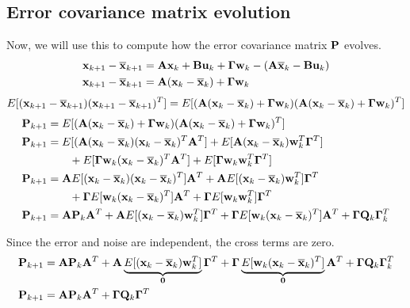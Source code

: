 \subsection{Error covariance matrix evolution}

Now, we will use this to compute how the \gls{error} covariance matrix $\mathbf{P}$
evolves.
\begin{align*}
  \mathbf{x}_{k+1} - \overline{\mathbf{x}}_{k+1} &= \mathbf{A}\mathbf{x}_k +
    \mathbf{B}\mathbf{u}_k + \mathbf{\Gamma}\mathbf{w}_k - (\mathbf{A}\overline{\mathbf{x}}_k -
    \mathbf{B}\mathbf{u}_k) \\
  \mathbf{x}_{k+1} - \overline{\mathbf{x}}_{k+1} &=
    \mathbf{A}(\mathbf{x}_k - \overline{\mathbf{x}}_k) + \mathbf{\Gamma}\mathbf{w}_k
\end{align*}
\begin{equation*}
  E[(\mathbf{x}_{k+1} - \overline{\mathbf{x}}_{k+1})(\mathbf{x}_{k+1} - \overline{\mathbf{x}}_{k+1})^T] =
    E[(\mathbf{A}(\mathbf{x}_k - \overline{\mathbf{x}}_k) + \mathbf{\Gamma}\mathbf{w}_k)
      (\mathbf{A}(\mathbf{x}_k - \overline{\mathbf{x}}_k) + \mathbf{\Gamma}\mathbf{w}_k)^T]
\end{equation*}
\begin{align*}
  \mathbf{P}_{k+1} &=
    E[(\mathbf{A}(\mathbf{x}_k - \overline{\mathbf{x}}_k) + \mathbf{\Gamma}\mathbf{w}_k)
      (\mathbf{A}(\mathbf{x}_k - \overline{\mathbf{x}}_k) + \mathbf{\Gamma}\mathbf{w}_k)^T] \\
  \mathbf{P}_{k+1} &=
    E[(\mathbf{A}(\mathbf{x}_k - \overline{\mathbf{x}}_k)(\mathbf{x}_k - \overline{\mathbf{x}}_k)^T
      \mathbf{A}^T] +
    E[\mathbf{A}(\mathbf{x}_k - \overline{\mathbf{x}}_k)\mathbf{w}_k^T\mathbf{\Gamma}^T] \\
    &\qquad + E[\mathbf{\Gamma}\mathbf{w}_k(\mathbf{x}_k - \overline{\mathbf{x}}_k)^T\mathbf{A}^T] +
    E[\mathbf{\Gamma}\mathbf{w}_k\mathbf{w}_k^T\mathbf{\Gamma}^T] \\
  \mathbf{P}_{k+1} &=
    \mathbf{A}E[(\mathbf{x}_k - \overline{\mathbf{x}}_k)(\mathbf{x}_k - \overline{\mathbf{x}}_k)^T]
    \mathbf{A}^T +
    \mathbf{A}E[(\mathbf{x}_k - \overline{\mathbf{x}}_k)\mathbf{w}_k^T]\mathbf{\Gamma}^T \\
    &\qquad + \mathbf{\Gamma} E[\mathbf{w}_k(\mathbf{x}_k - \overline{\mathbf{x}}_k)^T]\mathbf{A}^T +
    \mathbf{\Gamma} E[\mathbf{w}_k\mathbf{w}_k^T]\mathbf{\Gamma}^T \\
  \mathbf{P}_{k+1} &= \mathbf{A}\mathbf{P}_k\mathbf{A}^T +
    \mathbf{A}E[(\mathbf{x}_k - \overline{\mathbf{x}}_k)\mathbf{w}_k^T]\mathbf{\Gamma}^T +
    \mathbf{\Gamma} E[\mathbf{w}_k(\mathbf{x}_k - \overline{\mathbf{x}}_k)^T]\mathbf{A}^T +
    \mathbf{\Gamma}\mathbf{Q}_k\mathbf{\Gamma}_k^T
\end{align*}

Since the error and noise are independent, the cross terms are zero.
\begin{align*}
  \mathbf{P}_{k+1} &= \mathbf{A}\mathbf{P}_k\mathbf{A}^T +
    \mathbf{A}\underbrace{
      E[(\mathbf{x}_k - \overline{\mathbf{x}}_k)\mathbf{w}_k^T]}_{\mathbf{0}}\mathbf{\Gamma}^T +
    \mathbf{\Gamma}\underbrace{
      E[\mathbf{w}_k(\mathbf{x}_k - \overline{\mathbf{x}}_k)^T]}_{\mathbf{0}}\mathbf{A}^T +
    \mathbf{\Gamma}\mathbf{Q}_k\mathbf{\Gamma}_k^T \\
  \mathbf{P}_{k+1} &= \mathbf{A}\mathbf{P}_k\mathbf{A}^T +
    \mathbf{\Gamma}\mathbf{Q}_k\mathbf{\Gamma}^T
\end{align*}

